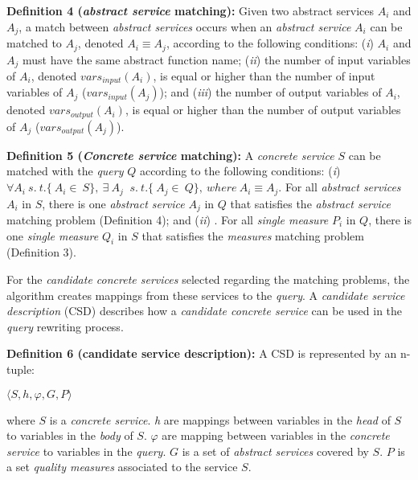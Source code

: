 \noindent \textbf{Definition 4 (\textit{abstract service} matching):} 
Given two abstract services $A_{i}$ and $A_{j}$, a match between \textit{abstract services} occurs when an \textit{abstract service} $A_{i}$ can be matched to $A_{j}$, denoted $A_{i} \equiv A_{j}$, according to the following conditions: 
(\textit{i}) $A_{i}$ and $A_{j}$ must have the same abstract function name; 
(\textit{ii}) the number of input variables of $A_{i}$, denoted $vars_{input}(A_{i})$, is equal or higher than the number of input variables of $A_{j}$ ($vars_{input}(A_{j})$); and 
(\textit{iii}) the number of output variables of $A_{i}$, denoted $vars_{output}(A_{i})$, is equal or higher than the number of output variables of $A_{j}$ ($vars_{output}(A_{j})$).

\noindent \textbf{Definition 5 (\textit{Concrete service} matching):} 
A \textit{concrete service} $S$ can be matched with the \textit{query} $Q$ according to the following conditions:
(\textit{i}) $\forall A_{i}  \ s. \ t. \lbrace\ A_{i} \in \ S\rbrace, \ \exists \ A_{j} \ $ $s. \ t. \lbrace\ A_{j} \in \ Q\rbrace, \ where \ A_{i} \equiv A_{j}.$ For all \textit{abstract services} $A_{i}$ in $S$, there is one \textit{abstract service} $A_{j}$ in $Q$ that satisfies the \textit{abstract service} matching problem (Definition 4); and
(\textit{ii}) . For all \textit{single measure} $P_{i}$ in $Q$, there is one \textit{single measure} $Q_{i}$ in $S$ that satisfies the \textit{measures} matching problem (Definition 3).

For the \textit{candidate concrete services} selected regarding the matching problems, the algorithm creates mappings from these services to the \textit{query}.
A \textit{candidate service description} (CSD) describes how a \textit{candidate concrete service} can be used in the \textit{query} rewriting process.

\noindent \textbf{Definition 6 (candidate service description):} A CSD is represented by an n-tuple:
\begin{center}
$\langle S, h, \varphi, G, P\rangle$
\end{center}
where $S$ is a \textit{concrete service}. 
\textit{h} are mappings between variables in the \textit{head} of $S$ to variables in the \textit{body} of $S$. 
$\varphi$ are mapping between variables in the \textit{concrete service} to variables in the \textit{query}.
$G$ is a set of \textit{abstract services} covered by $S$. 
$P$ is a set \textit{quality measures} associated to the service $S$. 


